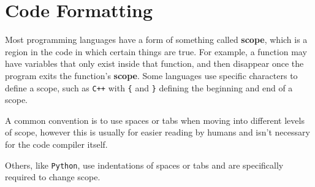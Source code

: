 \section{Code Formatting}

Most programming languages have a form of something called
\textbf{scope}, which is a region in the code in which certain things
are true. For example, a function may have variables that only exist
inside that function, and then disappear once the program exits the
function's \textbf{scope}. Some languages use specific characters to
define a scope, such as \texttt{C++} with \texttt{\{} and \texttt{\}}
defining the beginning and end of a scope.

\begin{Shaded}
\begin{Highlighting}[]
\OperatorTok{()}
\OperatorTok{\{}
\OperatorTok{\textless{}\textless{}} \OperatorTok{;}
     \OperatorTok{(} \OperatorTok{\textless{}} \OperatorTok{)}
    \OperatorTok{\{}
\OperatorTok{\textless{}\textless{}} \OperatorTok{;}
    \OperatorTok{\}}
    \OperatorTok{;}
\OperatorTok{\}}
\end{Highlighting}
\end{Shaded}

A common convention is to use spaces or tabs when moving into different
levels of scope, however this is usually for easier reading by humans
and isn't necessary for the code compiler itself.

Others, like \texttt{Python}, use indentations of spaces or tabs and are
specifically required to change scope.

\begin{Shaded}
\begin{Highlighting}[]
\OperatorTok{=}\OperatorTok{+} 

\OperatorTok{=} 
\end{Highlighting}
\end{Shaded}

